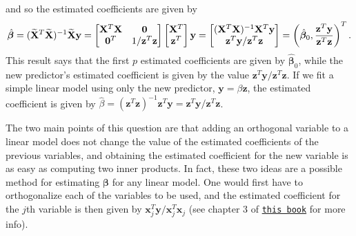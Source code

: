 \documentclass[10pt]{article}
\begin{document}
and so the estimated coefficients are given by 
\begin{align}
    \hat{\bm{\beta}}
    = (\widetilde{\mathbf{X}}^T\widetilde{\mathbf{X}})^{-1}\widetilde{\mathbf{X}}\mathbf{y}
    = \begin{bmatrix}
        \mathbf{X}^T\mathbf{X} & \mathbf{0} \\
        \mathbf{0}^T & 1 / \mathbf{z}^T\mathbf{z}
    \end{bmatrix}
    \begin{bmatrix}
        \mathbf{X}^T \\ \mathbf{z}^T
    \end{bmatrix}
    \mathbf{y}
    = \begin{bmatrix}
        (\mathbf{X}^T\mathbf{X})^{-1}\mathbf{X}^T\mathbf{y} \\
        \mathbf{z}^T\mathbf{y} / \mathbf{z}^T\mathbf{z}
    \end{bmatrix}
    = \left( \hat{\bm{\beta}}_0, \frac{\mathbf{z}^T\mathbf{y}}{\mathbf{z}^T\mathbf{z}} \right)^T.
\end{align}
This result says that the first \(p\) estimated coefficients are given by \(\hat{\bm{\beta}}_0\), while the new predictor's estimated coefficient is 
given by the value \(\mathbf{z}^T\mathbf{y} / \mathbf{z}^T\mathbf{z}\). If we fit a simple linear model using only the new predictor, 
\(\mathbf{y} = \beta \mathbf{z}\), the estimated coefficient is given by 
\(\hat{\beta} = (\mathbf{z}^T\mathbf{z})^{-1}\mathbf{z}^T\mathbf{y} = \mathbf{z}^T\mathbf{y} / \mathbf{z}^T\mathbf{z}\).

The two main points of this question are that adding an orthogonal variable to a linear model does not change the value of the estimated coefficients 
of the previous variables, and obtaining the estimated coefficient for the new variable is as easy as computing two inner products. 
In fact, these two ideas are a possible method for estimating \(\bm{\beta}\) for any linear model. One would first have to orthogonalize each of the 
variables to be used, and the estimated coefficient for the \(j\)th variable is then given by \(\mathbf{x}_j^T\mathbf{y} / \mathbf{x}_j^T\mathbf{x}_j\)
(see chapter 3 of \href{https://web.stanford.edu/~hastie/ElemStatLearn/}{\texttt{this book}} for more info).
\end{document}
